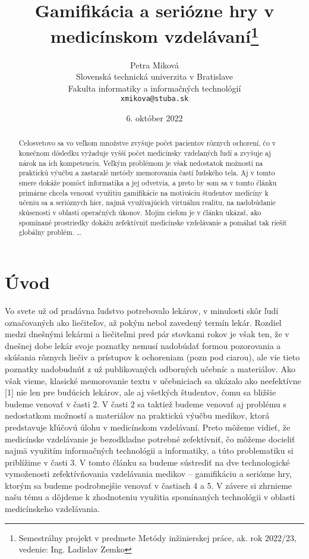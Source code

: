\documentclass[10pt,twoside,slovak,a4paper]{article}
\title{Gamifikácia a seriózne hry v medicínskom vzdelávaní\thanks{Semestrálny projekt v predmete Metódy inžinierskej práce, ak. rok 2022/23, vedenie: Ing. Ladislav Zemko}} %
\author{Petra Miková\\[2pt]
	{\small Slovenská technická univerzita v Bratislave}\\
	{\small Fakulta informatiky a informačných technológií}\\
	{\small \texttt{xmikova@stuba.sk}}
	}
\date{\small 6. október 2022} %
\begin{document}
\maketitle

\begin{abstract}
Celosvetovo sa vo veľkom množstve zvyšuje počet pacientov rôznych ochorení, čo v konečnom dôsledku vyžaduje vyšší počet medicínsky vzdelaných ľudí a zvyšuje aj nárok na ich kompetenciu. Veľkým problémom je však nedostatok možností na praktickú výučbu a zastaralé metódy memorovania častí ľudského tela. Aj v tomto smere dokáže pomôcť informatika a jej odvetvia, a preto by som sa v tomto článku primárne chcela venovať využitiu gamifikácie na motiváciu študentov medicíny k učeniu sa a serióznych hier, najmä využívajúcich virtuálnu realitu, na nadobúdanie skúsenosti v oblasti operačných úkonov. Mojim cieľom je v článku ukázať, ako spomínané prostriedky dokážu zefektívniť medicínske vzdelávanie a pomáhať tak riešiť globálny problém.
\ldots
\end{abstract}



\section{Úvod}

Vo svete už od pradávna ľudstvo potrebovalo lekárov, v minulosti skôr ľudí označovaných ako liečiteľov, až pokým nebol zavedený termín lekár. Rozdiel medzi dnešnými lekármi a liečiteľmi pred pár stovkami rokov je však ten, že v dnešnej dobe lekár svoje poznatky nemusí nadobúdať formou pozorovania a skúšania rôznych liečiv a prístupov k ochoreniam (pozn pod ciarou), ale vie tieto poznatky nadobudnúť z už publikovaných odborných učebníc a materiálov. Ako však vieme, klasické memorovanie textu v učebniciach sa ukázalo ako neefektívne [1] nie len pre budúcich lekárov, ale aj všetkých študentov, čomu sa bližšie budeme venovať v časti 2. V časti 2 sa taktiež budeme venovať aj problému s nedostatkom možností a materiálov na praktickú výučbu medikov, ktorá predstavuje kľúčovú úlohu v medicínskom vzdelávaní. Preto môžeme vidieť, že medicínske vzdelávanie je bezodkladne potrebné zefektívniť, čo môžeme docieliť najmä využitím informačných technológii a informatiky, a túto problematiku si priblížime v časti 3. V tomto článku sa budeme sústrediť na dve technologické vymoženosti zefektívňovania vzdelávania medikov – gamifikáciu a seriózne hry, ktorým sa budeme podrobnejšie venovať v častiach 4 a 5. V závere si zhrnieme našu tému a dôjdeme k zhodnoteniu využitia spomínaných technológii v oblasti medicínskeho vzdelávania.
\end{document}
